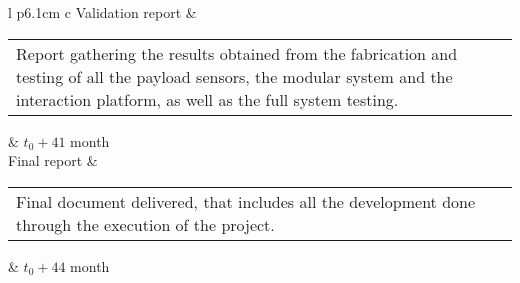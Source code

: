 \begin{longtable}[H]{l p{6.1cm} c}
	Validation report & \begin{tabular}[c]{@{}l@{}}\begin{minipage}[t]{\linewidth}
			Report gathering the results obtained from the fabrication and testing of all the payload sensors, the modular system and the interaction platform, as well as the full system testing. \vspace{0.3cm}
	\end{minipage} \end{tabular}   & $t_0 +41$ month                                                                                                                                           \\  \midrule
	Final report & \begin{tabular}[c]{@{}l@{}}\begin{minipage}[t]{\linewidth}
			Final document delivered, that includes all the development done through the execution of the project. \vspace{0.3cm}
	\end{minipage} \end{tabular}   & $t_0 + 44$ month                                                                                                                                           
	
		\\ \bottomrule[2pt]
	\caption{Project Deliverables}
\end{longtable}


